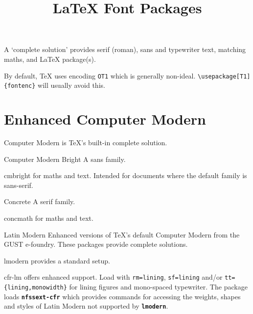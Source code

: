 \documentclass[a4paper,welsh,british,twocolumn]{article}
\title{\LaTeX{} Font Packages}
\begin{document}
\maketitle\thispagestyle{fancy}
\newcommand*\lpack[1]{\texttt{\bfseries #1}}
\newcommand*\addcolon[1]{#1:}
\newcommand*\seealso[1]{\emph{See also \emph{#1}.}}
\noindent A ‘complete solution’ provides serif (roman), sans and typewriter text, matching maths, and \LaTeX{} package(s).\medskip\par
\noindent By default, \TeX{} uses encoding \verb|OT1| which is generally non-ideal.
\verb|\usepackage[T1]{fontenc}| will usually avoid this.
\section{Enhanced Computer Modern}\label{sec:cm}
Computer Modern is \TeX's built-in complete solution.
\begin{fontopts}
  \item[Computer Modern Bright] A sans family.
  \begin{pkgdescription}
    \item[cmbright] for maths and text.
	Intended for documents where the default family is sans-serif.
  \end{pkgdescription}
  \item[Concrete] A serif family.
  \begin{pkgdescription}
    \item[concmath] for maths and text.
  \end{pkgdescription}
  \item[Latin Modern] Enhanced versions of \TeX's default Computer Modern from the GUST e-foundry.
  These packages provide complete solutions.
  \begin{pkgdescription}
    \item[lmodern] provides a standard set\-up.
	\item[cfr-lm] offers enhanced support.
	Load with \verb|rm=lining|, \verb|sf=lining| and/or \verb|tt={lining,monowidth}| for lining figures and mono-spaced typewriter.
	The package loads \lpack{nfssext-cfr} which provides commands for accessing the weights, shapes and styles of Latin Modern not supported by \lpack{lmodern}.
  \end{pkgdescription}
\end{fontopts}
\end{document}
